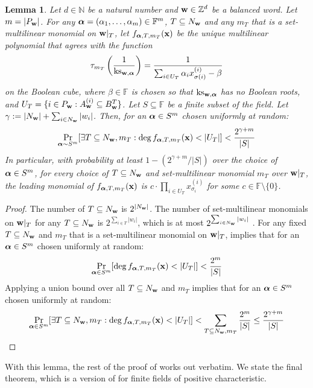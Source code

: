 \documentclass[11pt]{article}
\newtheorem{lemma}[theorem]{Lemma}
\newcommand{\F}{\mathbb{F}}
\begin{document}
\begin{lemma}\label{lem: ght degree lower bound positive char}
Let $d\in \mathbb{N}$ be a natural number and $\mathbf{w} \in \mathbb{Z}^d$ be a balanced word. Let $m = |P_{\mathbf{w}}|$. For any $\bfalpha = (\alpha_1, \dots, \alpha_m) \in \F^m$, $T \subseteq N_{\mathbf{w}}$ and any $m_T$ that is a set-multilinear monomial on $\mathbf{w}|_T$, let $ f_{\boldsymbol{\alpha},T,m_T}(\mathbf{x})$ be the unique multilinear polynomial that agrees with the function $$\tau_{m_T} \left (\frac{1}{\operatorname{ks}_{\mathbf{w},\boldsymbol{\alpha}}} \right ) = \frac{1}{\sum_{i\in U_T}{\alpha_ix_{\sigma(i)}^{(i)}}-\beta}$$ on the Boolean cube, where $\beta \in \F$ is chosen so that $\operatorname{ks}_{\mathbf{w},\boldsymbol{\alpha}}$ has no Boolean roots, and $U_T = \{i \in P_{\mathbf{w}}: A_{\mathbf{w}}^{(i)} \subseteq B_{\mathbf{w}}^T\}$. 
Let $S \subseteq \F$ be a finite subset of the field. Let $\gamma := |N_{\mathbf{w}}|+\sum_{i\in N_{\mathbf{w}}}|w_i|$.
Then, for an $\boldsymbol{\alpha} \in S^m$ chosen uniformly at random: $$\Pr_{\boldsymbol{\alpha} \sim S^m}[\exists T\subseteq N_{\mathbf{w}}, m_T:\deg{f_{\ensuremath{\boldsymbol{\alpha}},T,m_T}(\mathbf{x})} < |U_T|] < \frac{2^{\gamma+m}}{|S|}$$
In particular, with probability at least $1-(2^{\gamma+m}/|S|)$ over the choice of $\boldsymbol{\alpha} \in S^m$, for every choice of $T\subseteq N_{\mathbf{w}}$ and set-multilinear monomial $m_T$ over $\mathbf{w}|_T$, the leading monomial of $f_{\boldsymbol{\alpha},T,m_T}(\mathbf{x})$ is $c\cdot\prod_{i\in U_T}x_{\sigma_i}^{(i)}$ for some $c\in\F\setminus\{0\}$.     
\end{lemma}
\begin{proof}
    The number of $T\subseteq N_{\mathbf{w}}$ is $2^{|N_{\mathbf{w}}|}$. The number of set-multilinear monomials on $\mathbf{w}|_T$ for any $T\subseteq N_{\mathbf{w}}$ is $2^{\sum_{i\in T}|w_i|}$, which is at most $2^{\sum_{i\in N_{\mathbf{w}}}|w_i|}$ . For any fixed $T \subseteq N_{\mathbf{w}}$ and $m_T$ that is a set-multilinear monomial on $\mathbf{w}|_T$,  implies that for an $\boldsymbol{\alpha} \in S^m$ chosen uniformly at random: $$\Pr_{\boldsymbol{\alpha} \in S^m}[\deg{f_{\ensuremath{\boldsymbol{\alpha}},T,m_T}(\mathbf{x})} < |U_T|] < \frac{2^{m}}{|S|}$$
    Applying a union bound over all $T \subseteq N_{\mathbf{w}}$ and $m_T$ implies that for an $\boldsymbol{\alpha} \in S^m$ chosen uniformly at random: $$\Pr_{\boldsymbol{\alpha} \in S^m}[\exists T\subseteq N_{\mathbf{w}}, m_T:\deg{f_{\ensuremath{\boldsymbol{\alpha}},T,m_T}(\mathbf{x})} < |U_T|] < \sum_{T\subseteq N_{\mathbf{w}},m_T}\frac{2^{m}}{|S|} \leq \frac{2^{\gamma+m}}{|S|} $$    
\end{proof}

With this lemma, the rest of the proof of \cite{GHT} works out verbatim. We state the final theorem, which is a version of  for finite fields of positive characteristic.
\end{document}
